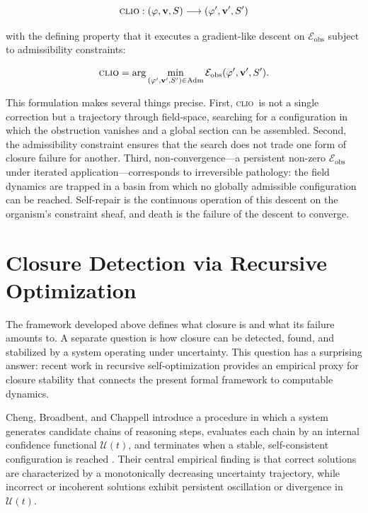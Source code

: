 \documentclass[11pt, a4paper]{article}
\theoremstyle{plain}
\theoremstyle{definition}
\theoremstyle{remark}
\newcommand{\vv}{\mathbf{v}}
\newcommand{\Ent}{S}
\newcommand{\CLIO}{\textsc{clio}}
\begin{document}
\[
\CLIO : (\varphi, \vv, \Ent) \longrightarrow (\varphi', \vv', \Ent')
\]

with the defining property that it executes a gradient-like descent on $\mathcal{E}_{\mathrm{obs}}$ subject to admissibility constraints:

\[
\CLIO = \arg\min_{(\varphi', \vv', \Ent') \in \mathrm{Adm}} \mathcal{E}_{\mathrm{obs}}(\varphi', \vv', \Ent').
\]

This formulation makes several things precise. First, \CLIO\ is not a single correction but a trajectory through field-space, searching for a configuration in which the obstruction vanishes and a global section can be assembled. Second, the admissibility constraint ensures that the search does not trade one form of closure failure for another. Third, non-convergence---a persistent non-zero $\mathcal{E}_{\mathrm{obs}}$ under iterated application---corresponds to irreversible pathology: the field dynamics are trapped in a basin from which no globally admissible configuration can be reached. Self-repair is the continuous operation of this descent on the organism's constraint sheaf, and death is the failure of the descent to converge.

\section{Closure Detection via Recursive Optimization}

The framework developed above defines what closure is and what its failure amounts to. A separate question is how closure can be detected, found, and stabilized by a system operating under uncertainty. This question has a surprising answer: recent work in recursive self-optimization provides an empirical proxy for closure stability that connects the present formal framework to computable dynamics.

Cheng, Broadbent, and Chappell introduce a procedure in which a system generates candidate chains of reasoning steps, evaluates each chain by an internal confidence functional $\mathcal{U}(t)$, and terminates when a stable, self-consistent configuration is reached \cite{cheng2025clio}. Their central empirical finding is that correct solutions are characterized by a monotonically decreasing uncertainty trajectory, while incorrect or incoherent solutions exhibit persistent oscillation or divergence in $\mathcal{U}(t)$.
\end{document}
